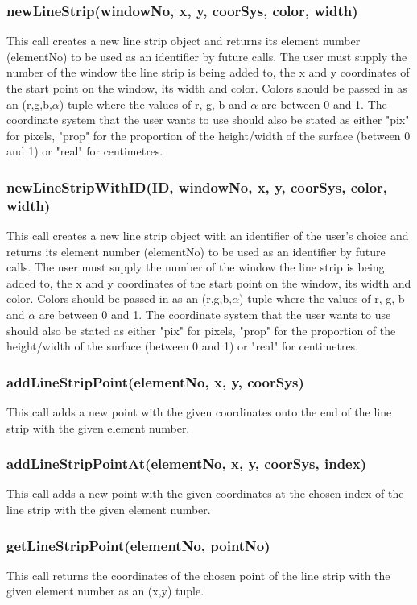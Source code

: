 \documentclass{acm_proc_article-sp}
\begin{document}
\subsubsection{newLineStrip(windowNo, x, y, coorSys, color, width)}
This call creates a new line strip object and returns its element number (elementNo) to be used as an identifier by future calls. The user must supply the number of the window the line strip is being added to, the x and y coordinates of the start point on the window, its width and color. Colors should be passed in as an (r,g,b,$\alpha$) tuple where the values of r, g, b and $\alpha$ are between 0 and 1. The coordinate system that the user wants to use should also be stated as either "pix" for pixels, "prop" for the proportion of the height/width of the surface (between 0 and 1) or "real" for centimetres.
\subsubsection{newLineStripWithID(ID, windowNo, x, y, coorSys, color, width)}
This call creates a new line strip object with an identifier of the user's choice and returns its element number (elementNo) to be used as an identifier by future calls. The user must supply the number of the window the line strip is being added to, the x and y coordinates of the start point on the window, its width and color. Colors should be passed in as an (r,g,b,$\alpha$) tuple where the values of r, g, b and $\alpha$ are between 0 and 1. The coordinate system that the user wants to use should also be stated as either "pix" for pixels, "prop" for the proportion of the height/width of the surface (between 0 and 1) or "real" for centimetres.
\subsubsection{addLineStripPoint(elementNo, x, y, coorSys)}
This call adds a new point with the given coordinates onto the end of the line strip with the given element number.
\subsubsection{addLineStripPointAt(elementNo, x, y, coorSys, index)}
This call adds a new point with the given coordinates at the chosen index of the line strip with the given element number.
\subsubsection{getLineStripPoint(elementNo, pointNo)}
This call returns the coordinates of the chosen point of the line strip with the given element number as an (x,y) tuple.
\end{document}
